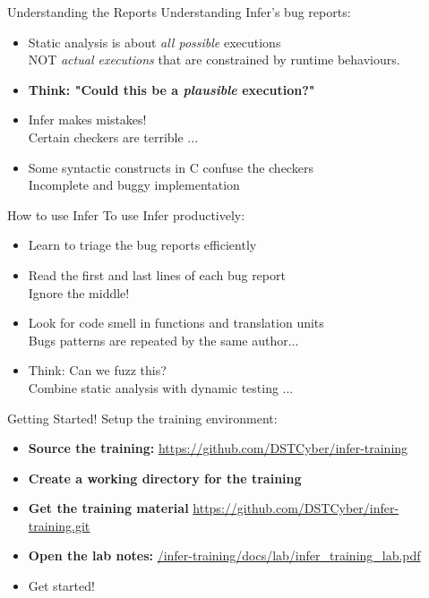 \begin{frame}{Understanding the Reports}
	Understanding Infer's bug reports:
	\begin{itemize}
		\item Static analysis is about \textit{all possible} executions\\
		NOT \textit{actual executions} that are constrained by runtime behaviours.
		\item\textbf{Think: "Could this be a \textit{plausible} execution?"}
		\item Infer makes mistakes!\\
		Certain checkers are terrible ...
		\item Some syntactic constructs in C confuse the checkers\\
		Incomplete and buggy implementation
	\end{itemize}
\end{frame}

\begin{frame}{How to use Infer}
To use Infer productively:
\begin{itemize}
	\item Learn to triage the bug reports efficiently
	\item Read the first and last lines of each bug report\\
	Ignore the middle!
	\item Look for code smell in functions and translation units\\
	Bugs patterns are repeated by the same author...
	\item Think: Can we fuzz this?\\
	Combine static analysis with dynamic testing ...
\end{itemize}
\end{frame}

\begin{frame}{Getting Started!}
Setup the training environment: 
\begin{itemize}
	\item \textbf{Source the training:}
	\url{https://github.com/DSTCyber/infer-training}
	\item \textbf{Create a working directory for the training}
	\item \textbf{Get the training material } 
	\url{https://github.com/DSTCyber/infer-training.git}
	\item \textbf{Open the lab notes:}
	\url{/infer-training/docs/lab/infer_training_lab.pdf}
	\item Get started!
\end{itemize} 
\end{frame}



